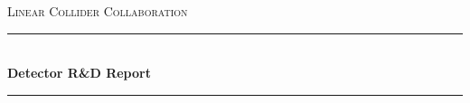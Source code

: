 \documentclass[10pt,final]{report}
\begin{document}
\begin{titlepage} 
    \newcommand{\HRule}{\rule{\linewidth}{0.5mm}} %
	\center %
	
	
	\textsc{\LARGE Linear Collider Collaboration}\\[1.5cm] %
		
	
	
	\HRule\\[0.4cm]
	
	{\huge\bfseries Detector R\&D Report}\\[0.4cm] %
	
	\HRule\\[1.5cm]


\end{titlepage}
\end{document}

